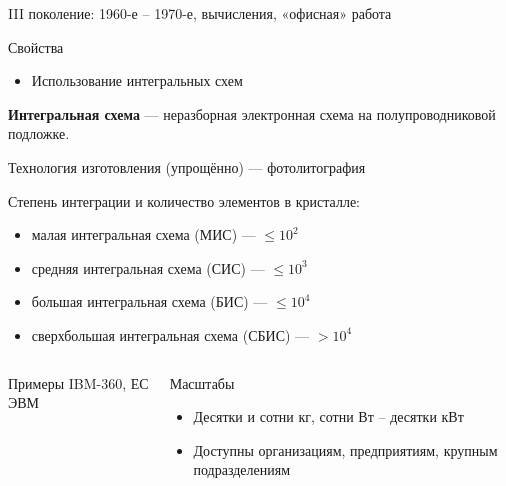 \documentclass[xetex,aspectratio=43]{beamer}
\begin{document}
\begin{frame}{III поколение: 1960-е -- 1970-е, вычисления, «офисная» работа}
	
	
	\begin{block}{Свойства}
		\begin{itemize}
			\item
			Использование интегральных схем
		\end{itemize}
		
		\textbf{Интегральная схема} --- неразборная электронная схема на
		полупроводниковой подложке.
		
		Технология изготовления (упрощённо) --- фотолитография
		
		Степень интеграции и количество элементов в кристалле:
		
		\begin{itemize}
			\tightlist
			\item
			малая интегральная схема (МИС) --- \(\le 10^2\)
			\item
			средняя интегральная схема (СИС) --- \(\le 10^3\)
			\item
			большая интегральная схема (БИС) --- \(\le 10^4\)
			\item
			сверхбольшая интегральная схема (СБИС) --- \(> 10^4\)
		\end{itemize}
	\end{block}
	
	\begin{columns}
		\begin{column}{0.25\textwidth}
			\begin{block}{Примеры}
				\vspace{5mm}
				IBM-360, ЕС ЭВМ
				\vspace{6mm}
			\end{block}
		\end{column}
		\begin{column}{0.75\textwidth}	
			\begin{block}{Масштабы}
				\begin{itemize}
					\item
					Десятки и сотни кг, сотни Вт -- десятки кВт
					\item
					Доступны организациям, предприятиям, крупным подразделениям
				\end{itemize}
			\end{block}
		\end{column}
	\end{columns}

\end{frame}
\end{document}
